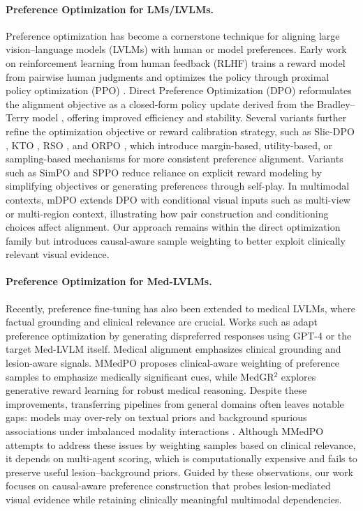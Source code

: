 \paragraph{Preference Optimization for LMs/LVLMs.}
Preference optimization has become a cornerstone technique for aligning large vision–language models (LVLMs) with human or model preferences. Early work on reinforcement learning from human feedback (RLHF) \cite{Christiano2017RLHF} trains a reward model from pairwise human judgments and optimizes the policy through proximal policy optimization (PPO) \cite{Schulman2017PPO}. Direct Preference Optimization (DPO) \cite{rafailov2023direct} reformulates the alignment objective as a closed-form policy update derived from the Bradley–Terry model \cite{Bradley1952BT}, offering improved efficiency and stability. Several variants further refine the optimization objective or reward calibration strategy, such as Slic-DPO \cite{Zhao2023SlicDPO}, KTO \cite{Ethayarajh2024KTO}, RSO \cite{Liu2023RSO}, and ORPO \cite{Hong2024ORPO}, which introduce margin-based, utility-based, or sampling-based mechanisms for more consistent preference alignment. Variants such as SimPO \cite{meng2024simpo} and SPPO \cite{wu2025selfplay} reduce reliance on explicit reward modeling by simplifying objectives or generating preferences through self-play. In multimodal contexts, mDPO \cite{wang2024mdpo} extends DPO with conditional visual inputs such as multi-view or multi-region context, illustrating how pair construction and conditioning choices affect alignment. Our approach remains within the direct optimization family but introduces causal-aware sample weighting to better exploit clinically relevant visual evidence.

\paragraph{Preference Optimization for Med-LVLMs.} Recently, preference fine-tuning has also been extended to medical LVLMs, where factual grounding and clinical relevance are crucial. Works such as \cite{Banerjee2024MedAlign,Sun2024STLLaVAMed,Hein2024MedVQA} adapt preference optimization by generating dispreferred responses using GPT-4 or the target Med-LVLM itself. Medical alignment emphasizes clinical grounding and lesion-aware signals. MMedPO \cite{Zhu2025MMedPO} proposes clinical-aware weighting of preference samples to emphasize medically significant cues, while MedGR$^{2}$ \cite{Zhi2025MedGR2} explores generative reward learning for robust medical reasoning. Despite these improvements, transferring pipelines from general domains often leaves notable gaps: models may over-rely on textual priors and background spurious associations under imbalanced modality interactions \cite{Royer2024MultiMedEval,Cui2023GPT4VHallucination,Wu2023MedKLIP}. Although MMedPO attempts to address these issues by weighting samples based on clinical relevance, it depends on multi-agent scoring, which is computationally expensive and fails to preserve useful lesion–background priors. Guided by these observations, our work focuses on causal-aware preference construction that probes lesion-mediated visual evidence while retaining clinically meaningful multimodal dependencies.

